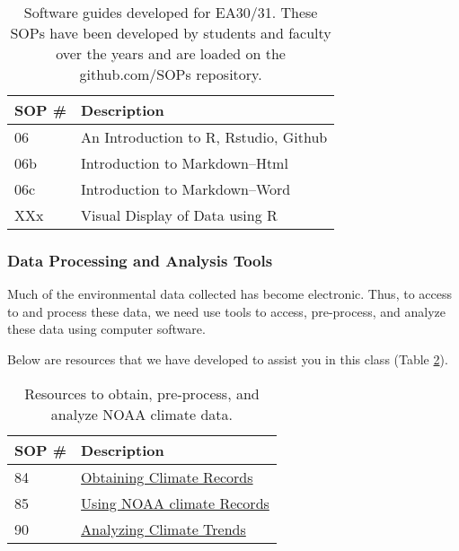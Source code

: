 \documentclass{article}\usepackage[]{graphicx}\usepackage[]{color}
\begin{document}
\begin{table}[h]
\caption{Software guides developed for EA30/31. These SOPs have been developed by students and faculty over the years and are loaded on the github.com/SOPs repository.}\label{tab:softwareguides}
\centering
\begin{tabular}{ll}\hline
SOP \#    & Description                                 \\\hline\hline
06        & An Introduction to R, Rstudio, Github \\
06b       & Introduction to Markdown--Html  \\
06c       & Introduction to Markdown--Word  \\
XXx       & Visual Display of Data using R  \\
\hline
\end{tabular}
\end{table}

\subsubsection{Data Processing and Analysis Tools}

Much of the environmental data collected has become electronic. Thus, to access to and process these data, we need use tools to access, pre-process, and analyze these data using computer software. 

Below are resources that we have developed to assist you in this class (Table \ref{tab:tools}).

\begin{table}[h]

\caption{Resources to obtain, pre-process, and analyze NOAA climate data.}\label{tab:tools}
\centering
\begin{tabular}{ll}\hline
SOP \#    & Description                                 \\\hline\hline
84        & \href{https://github.com/marclos/Climate_Change_Narratives/raw/master/Analysis_SOPs/SOP84_Obtaining_Climate_Records.pdf}{Obtaining Climate Records}\\
85        & \href{https://github.com/marclos/Climate_Change_Narratives/raw/master/Analysis_SOPs/SOP85_Using_NOAA_Climate_Records.pdf}{Using NOAA climate Records}\\
90        & \href{https://github.com/marclos/Climate_Change_Narratives/raw/master/Analysis_SOPs/SOP90_Analyzing_Trends.pdf}{Analyzing Climate Trends} \\ \hline
\end{tabular}
\end{table}
\end{document}
